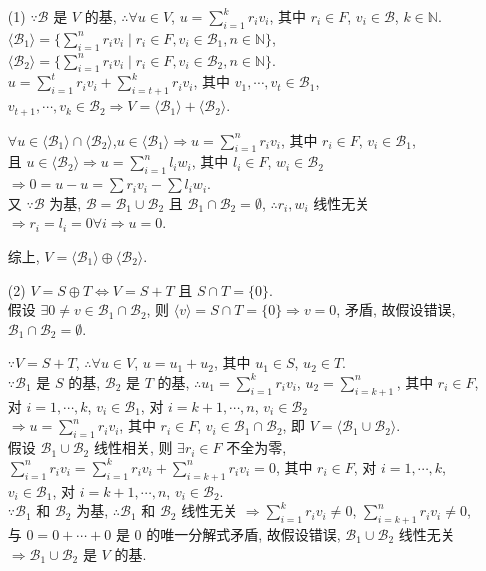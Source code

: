 \documentclass{note}
\begin{document}
\begin{pf}
    \begin{itemize}
        \item[(1)] $\because\mathcal{B}$ 是 $V$ 的基, $\therefore\forall u\in V$, $u=\sum_{i=1}^kr_iv_i$, 其中 $r_i\in F$, $v_i\in\mathcal{B}$, $k\in\mathbb{N}$.\\
        $\langle\mathcal{B}_1\rangle=\{\sum_{i=1}^nr_iv_i\mid r_i\in F,v_i\in\mathcal{B}_1,n\in\mathbb{N}\}$, $\langle\mathcal{B}_2\rangle=\{\sum_{i=1}^nr_iv_i\mid r_i\in F,v_i\in\mathcal{B}_2,n\in\mathbb{N}\}$.\\
        $u=\sum_{i=1}^tr_iv_i+\sum_{i=t+1}^kr_iv_i$, 其中 $v_1,\cdots,v_t\in\mathcal{B}_1$, $v_{t+1},\cdots,v_k\in\mathcal{B}_2\Longrightarrow V=\langle\mathcal{B}_1\rangle+\langle\mathcal{B}_2\rangle$.

        $\forall u\in\langle\mathcal{B}_1\rangle\cap\langle\mathcal{B}_2\rangle$,$u\in\langle\mathcal{B}_1\rangle\Longrightarrow u=\sum_{i=1}^nr_iv_i$, 其中 $r_i\in F$, $v_i\in\mathcal{B}_1$,\\
        且 $u\in\langle\mathcal{B}_2\rangle\Longrightarrow u=\sum_{i=1}^nl_iw_i$, 其中 $l_i\in F$, $w_i\in\mathcal{B}_2$\\
        $\Longrightarrow 0=u-u=\sum r_iv_i-\sum l_iw_i$.\\
        又 $\because\mathcal{B}$ 为基, $\mathcal{B}=\mathcal{B}_1\cup\mathcal{B}_2$ 且 $\mathcal{B}_1\cap\mathcal{B}_2=\emptyset$, $\therefore r_i,w_i$ 线性无关 $\Longrightarrow r_i=l_i=0\forall i\Longrightarrow u=0$.

        综上, $V=\langle\mathcal{B}_1\rangle\oplus\langle\mathcal{B}_2\rangle$.
        \item[(2)] $V=S\oplus T\Longleftrightarrow V=S+T$ 且 $S\cap T=\{0\}$.\\
        假设 $\exists 0\neq v\in\mathcal{B}_1\cap\mathcal{B}_2$, 则 $\langle v\rangle=S\cap T=\{0\}\Longrightarrow v=0$, 矛盾, 故假设错误, $\mathcal{B}_1\cap\mathcal{B}_2=\emptyset$.

        $\because V=S+T$, $\therefore\forall u\in V$, $u=u_1+u_2$, 其中 $u_1\in S$, $u_2\in T$.\\
        $\because\mathcal{B}_1$ 是 $S$ 的基, $\mathcal{B}_2$ 是 $T$ 的基, $\therefore u_1=\sum_{i=1}^kr_iv_i$, $u_2=\sum_{i=k+1}^n$, 其中 $r_i\in F$, 对 $i=1,\cdots,k$, $v_i\in\mathcal{B}_1$, 对 $i=k+1,\cdots,n$, $v_i\in\mathcal{B}_2$\\
        $\Longrightarrow u=\sum_{i=1}^nr_iv_i$, 其中 $r_i\in F$, $v_i\in\mathcal{B}_1\cap\mathcal{B}_2$, 即 $V=\langle\mathcal{B}_1\cup\mathcal{B}_2\rangle$.\\
        假设 $\mathcal{B}_1\cup\mathcal{B}_2$ 线性相关, 则 $\exists r_i\in F$ 不全为零, $\sum_{i=1}^nr_iv_i=\sum_{i=1}^kr_iv_i+\sum_{i=k+1}^nr_iv_i=0$, 其中 $r_i\in F$, 对 $i=1,\cdots,k$, $v_i\in\mathcal{B}_1$, 对 $i=k+1,\cdots,n$, $v_i\in\mathcal{B}_2$.\\
        $\because\mathcal{B}_1$ 和 $\mathcal{B}_2$ 为基, $\therefore\mathcal{B}_1$ 和 $\mathcal{B}_2$ 线性无关 $\Longrightarrow\sum_{i=1}^kr_iv_i\neq 0$, $\sum_{i=k+1}^nr_iv_i\neq 0$, 与 $0=0+\cdots+0$ 是 $0$ 的唯一分解式矛盾, 故假设错误, $\mathcal{B}_1\cup\mathcal{B}_2$ 线性无关 $\Longrightarrow\mathcal{B}_1\cup\mathcal{B}_2$ 是 $V$ 的基.


\end{itemize}
\end{pf}
\end{document}

